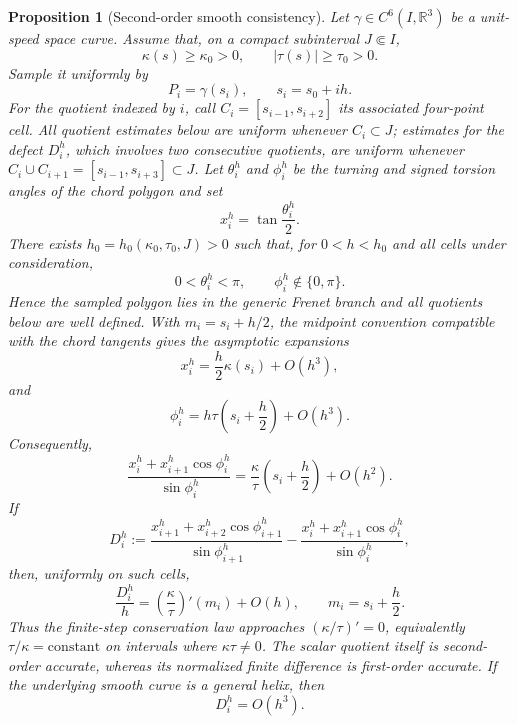 \documentclass[10pt,a4paper]{amsart}
\newtheorem{proposition}[theorem]{Proposition}
\theoremstyle{definition}
\theoremstyle{remark}
\numberwithin{equation}{section}
\begin{document}
\begin{proposition}[Second-order smooth consistency]\label{prop:smooth-consistency}
Let \(\gamma\in C^6(I,\mathbb R^3)\) be a unit-speed space curve.
Assume that, on a compact subinterval \(J\Subset I\),
\[
\kappa(s)\ge \kappa_0>0,\qquad |\tau(s)|\ge\tau_0>0.
\]
Sample it uniformly by
\[
P_i=\gamma(s_i),\qquad s_i=s_0+ih.
\]
For the quotient indexed by $i$, call $C_i=[s_{i-1},s_{i+2}]$ its associated four-point cell. All quotient estimates below are uniform whenever $C_i\subset J$; estimates for the defect $D_i^h$, which involves two consecutive quotients, are uniform whenever $C_i\cup C_{i+1}=[s_{i-1},s_{i+3}]\subset J$.
Let \(\theta_i^h\) and \(\phi_i^h\) be the turning and signed torsion
angles of the chord polygon and set
\[
x_i^h=\tan\frac{\theta_i^h}{2}.
\]
There exists $h_0=h_0(\kappa_0,\tau_0,J)>0$ such that, for $0<h<h_0$ and all cells under consideration,
\[
0<\theta_i^h<\pi,\qquad \phi_i^h\notin\{0,\pi\}.
\]
Hence the sampled polygon lies in the generic Frenet branch and all quotients below are well defined.
With $m_i=s_i+h/2$, the midpoint convention compatible with the chord tangents gives the
asymptotic expansions
\[
x_i^h=\frac h2\kappa(s_i)+O(h^3),
\]
and
\[
\phi_i^h=h\tau\left(s_i+\frac h2\right)+O(h^3).
\]
Consequently,
\[
\frac{x_i^h+x_{i+1}^h\cos\phi_i^h}{\sin\phi_i^h}
=
\frac{\kappa}{\tau}\left(s_i+\frac h2\right)+O(h^2).
\]
If
\[
D_i^h:=
\frac{x_{i+1}^h+x_{i+2}^h\cos\phi_{i+1}^h}{\sin\phi_{i+1}^h}
-
\frac{x_i^h+x_{i+1}^h\cos\phi_i^h}{\sin\phi_i^h},
\]
then, uniformly on such cells,
\[
\boxed{
\frac{D_i^h}{h}
=
\left(\frac{\kappa}{\tau}\right)'(m_i)+O(h)
},
\qquad m_i=s_i+\frac h2.
\]
Thus the finite-step conservation law approaches $(\kappa/\tau)'=0$, equivalently \(\tau/\kappa=\mathrm{constant}\) on intervals where \(\kappa\tau\neq0\). The scalar quotient itself is second-order accurate, whereas its normalized finite difference is first-order accurate. If the underlying smooth curve is a general helix, then
\[
D_i^h=O(h^3).
\]
\end{proposition}
\end{document}
